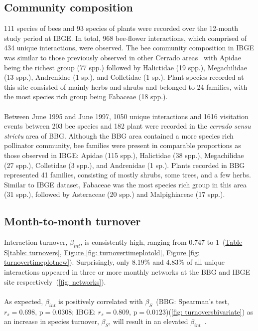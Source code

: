 \documentclass[11pt]{article}
\begin{document}
\subsection{Community composition}
111 species of bees and 93 species of plants were recorded over the 12-month study period at IBGE. In total, 968 bee-flower interactions, which comprised of 434 unique interactions, were observed. The bee community composition in IBGE was similar to those previously observed in other Cerrado areas~\citep{Silveira1995, Pinheiro-Machado2002} with Apidae being the richest group (77 spp.) followed by Halictidae (19 spp.), Megachilidae (13 spp.), Andrenidae (1 sp.), and Colletidae (1 sp.). Plant species recorded at this site consisted of mainly herbs and shrubs and belonged to 24 families, with the most species rich group being Fabaceae (18 spp.). \\
\\
Between June 1995 and June 1997, 1050 unique interactions and 1616 visitation events between 203 bee species and 182 plant were recorded in the \textit{cerrado sensu strictu} area of BBG. Although the BBG area contained a more species rich pollinator community, bee families were present in comparable proportions as those observed in IBGE: Apidae (115 spp.), Halictidae (38 spp.), Megachilidae (27 spp.), Colletidae (3 spp.), and Andrenidae (1 sp.). Plants recorded in BBG represented 41 families, consisting of mostly shrubs, some trees, and a few herbs. Similar to IBGE dataset, Fabaceae was the most species rich group in this area (31 spp.), followed by Asteraceae (20 spp.) and Malpighiaceae (17 spp.). \\

\subsection{Month-to-month turnover}
\label{subsec: turnover} 

Interaction turnover, $\beta_{int}$, is consistently high, ranging from 0.747 to 1~(\hyperref[table: turnovers]{Table S\ref{table: turnovers}}, \hyperref[fig: turnovertimeplotold]{Figure \ref{fig: turnovertimeplotold}}, \hyperref[fig: turnovertimeplotnew]{Figure \ref{fig: turnovertimeplotnew}}). Surprisingly, only 8.19\% and 4.83\% of all unique interactions appeared in three or more monthly networks at the BBG and IBGE site respectively~(\autoref{fig: networks}).\\
\\
As expected, $\beta_{int}$ is positively correlated with $\beta_{S}$~(BBG: Spearman's test, $r_{s}=0.698$, $\text{p}=0.0308$; IBGE: $r_{s}=0.809$, $\text{p}=0.0123$)(\autoref{fig: turnoversbivariate}) as an increase in species turnover, $\beta_{S}$, will result in an elevated $\beta_{int}$~\citep{Poisot2012}.
\end{document}
